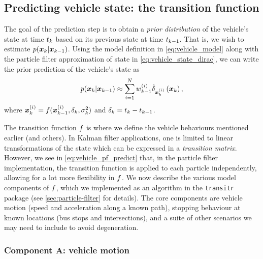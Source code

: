 \subsection{Predicting vehicle state: the transition function}
\label{sec:vehicle_model_trans}

The goal of the prediction step is to obtain a \emph{prior distribution} of the vehicle's state at time $t_k$ based on its previous state at time $t_{k-1}$. That is, we wish to estimate $p(\boldsymbol x_k | \boldsymbol x_{k-1})$. Using the model definition in \cref{eq:vehicle_model} along with the particle filter approximation of state in \cref{eq:vehicle_state_dirac}, we can write the prior prediction of the vehicle's state as
\begin{equation}
\label{eq:vehicle_pf_predict}
p(\boldsymbol x_k | \boldsymbol x_{k-1}) \approx
\sum_{i=1}^N
    w^{(i)}_{k-1}
    \dot\delta_{\boldsymbol x_k^{(i)}}\left(\boldsymbol x_k\right),
\end{equation}
where $\boldsymbol x_k^{(i)} = f(\boldsymbol x^{(i)}_{k-1}, \delta_k, \sigma^2_k)$ and $\delta_k = t_k - t_{k-1}$.

The transition function $f$ is where we define the vehicle behaviours mentioned earlier (and others). In Kalman filter applications, one is limited to linear transformations of the state which can be expressed in a \emph{transition matrix}. However, we see in \cref{eq:vehicle_pf_predict} that, in the particle filter implementation, the transition function is applied to each particle independently, allowing for a lot more flexibility in $f$. We now describe the various model components of $f$, which we implemented as an algorithm in the \verb+transitr+ package (see \cref{sec:particle-filter} for details). The core components are vehicle motion (speed and acceleration along a known path), stopping behaviour at known locations (bus stops and intersections), and a suite of other scenarios we may need to include to avoid degeneration.


\subsubsection{Component A: vehicle motion}
\label{sec:vehicle_model_behaviour}

